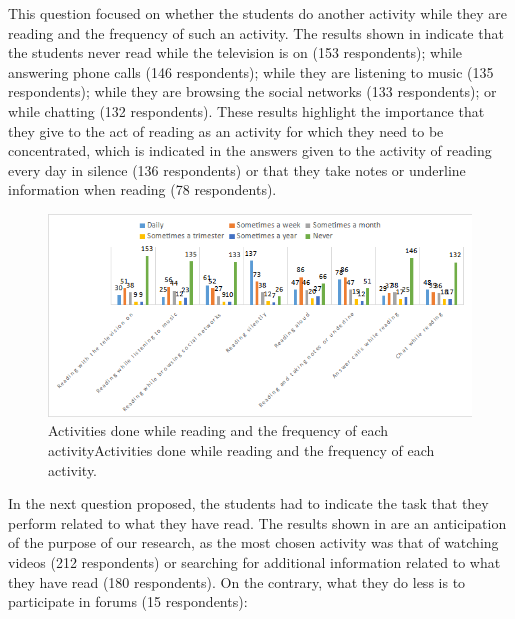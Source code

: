 \documentclass[english]{textolivre}
\begin{document}
This question focused on whether the students do another activity while they are reading and the frequency of such an activity. The results shown in  indicate that the students never read while the television is on (153 respondents); while answering phone calls (146 respondents); while they are listening to music (135 respondents); while they are browsing the social networks (133 respondents); or while chatting (132 respondents). These results highlight the importance that they give to the act of reading as an activity for which they need to be concentrated, which is indicated in the answers given to the activity of reading every day in silence (136 respondents) or that they take notes or underline information when reading (78 respondents).

\begin{figure}[htbp]
\centering
\begin{minipage}{.85\textwidth}
 \includegraphics[width=\textwidth]{Imagem4.png}
 \caption{Activities done while reading and the frequency of each activityActivities done while reading and the frequency of each activity.}
 \label{fig04}
\end{minipage}
\end{figure}

In the next question proposed, the students had to indicate the task that they perform related to what they have read. The results shown in  are an anticipation of the purpose of our research, as the most chosen activity was that of watching videos (212 respondents) or searching for additional information related to what they have read (180 respondents). On the contrary, what they do less is to participate in forums (15 respondents):
\end{document}
